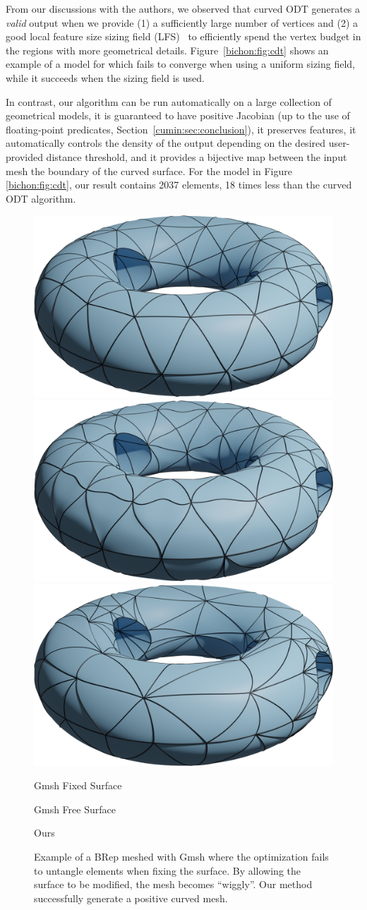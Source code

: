 From our discussions with the authors, we observed that curved ODT generates a \emph{valid} output when we provide (1) a sufficiently large number of vertices and (2) a good local feature size sizing field (LFS)~\cite{alliez2005variational} to efficiently spend the vertex budget in the regions with more geometrical details.  Figure~\ref{bichon:fig:cdt} shows an example of a model for which \cite{feng2018curved} fails to converge when using a uniform sizing field, while it succeeds when the sizing field is used.

In contrast, our algorithm can be run automatically on {a} large collection of geometrical models, it is guaranteed to have positive Jacobian (up to the use of floating-point predicates, Section~\ref{cumin:sec:conclusion}), it preserves features, it automatically controls the density of the output depending on the desired user-provided distance threshold, and it provides a bijective map between the input mesh the boundary of the curved surface. For the model in Figure \ref{bichon:fig:cdt}, our result contains 2037 elements, 18 times less than the curved ODT algorithm. %


\begin{figure}
    \centering\small
    \includegraphics[width=0.32\linewidth]{curve_meshing_in_shell_tex/figs/gmsh/not-bij}\hfill
    \includegraphics[width=0.32\linewidth]{curve_meshing_in_shell_tex/figs/gmsh/bij}\hfill
    \includegraphics[width=0.32\linewidth]{curve_meshing_in_shell_tex/figs/gmsh/torus}
     \parbox{.32\linewidth}{\centering Gmsh Fixed Surface}\hfill
    \parbox{.32\linewidth}{\centering Gmsh Free Surface}\hfill
    \parbox{.32\linewidth}{\centering Ours}\par
    \caption{Example of a BRep meshed with Gmsh where the optimization fails to untangle elements when fixing the surface. By allowing the surface to be modified, the mesh becomes ``wiggly''. Our method successfully generate a positive curved mesh.}
    \label{bichon:fig:gmsh-flipped}
\end{figure}


